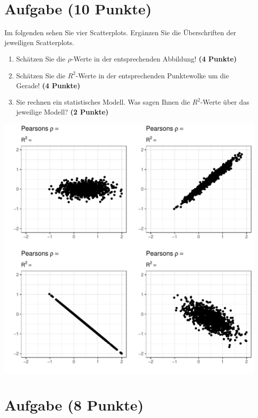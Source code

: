 \documentclass[a4paper, 10pt]{scrartcl}\usepackage[]{graphicx}\usepackage[]{color}
\makeatletter
\def\maxwidth{ %
  \ifdim\Gin@nat@width>\linewidth
    \linewidth
  \else
    \Gin@nat@width
  \fi
}
\makeatother
\begin{document}
\section{Aufgabe \hfill (10 Punkte)}

Im folgenden sehen Sie vier Scatterplots. Erg{\"a}nzen Sie die {\"U}berschriften
der jeweiligen Scatterplots.


\begin{enumerate}
\item Sch{\"a}tzen Sie die $\rho$-Werte in der entsprechenden
  Abbildung! \textbf{(4 Punkte)}
\item Sch{\"a}tzen Sie die $R^2$-Werte in der entsprechenden
  Punktewolke um die Gerade! \textbf{(4 Punkte)}
\item Sie rechnen ein statistisches Modell. Was sagen Ihnen die $R^2$-Werte
  {\"u}ber das jeweilige Modell? \textbf{(2 Punkte)}
\end{enumerate}




{\centering \includegraphics[width=\maxwidth]{img/correlation-02-1} 

}



 
\clearpage

\section{Aufgabe \hfill (8 Punkte)}
\end{document}
